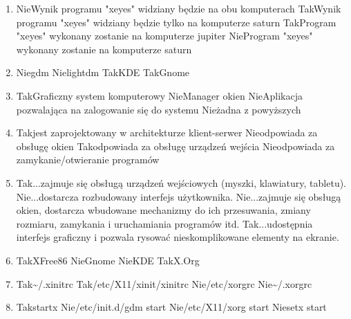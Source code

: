 \begin{enumerate}
	\item {}
	{Nie}{Wynik programu "xeyes" widziany będzie na obu komputerach}
	{Tak}{Wynik programu "xeyes" widziany będzie tylko na komputerze saturn}
	{Tak}{Program "xeyes" wykonany zostanie na komputerze jupiter}
	{Nie}{Program "xeyes" wykonany zostanie na komputerze saturn}

	\item {}
	{Nie}{gdm}
	{Nie}{lightdm}
	{Tak}{KDE}
	{Tak}{Gnome}
	
	\item {}
	{Tak}{Graficzny system komputerowy}
	{Nie}{Manager okien}
	{Nie}{Aplikacja pozwalająca na zalogowanie się do systemu}
	{Nie}{żadna z powyższych}	

	\item {}
	{Tak}{jest zaprojektowany w architekturze klient-serwer}
	{Nie}{odpowiada za obsługę okien}
	{Tak}{odpowiada za obsługę urządzeń wejścia}
	{Nie}{odpowiada za zamykanie/otwieranie programów}

	\item {}
	{Tak}{...zajmuje się obsługą urządzeń wejściowych (myszki, klawiatury, tabletu).}
	{Nie}{...dostarcza rozbudowany interfejs użytkownika.}
	{Nie}{...zajmuje się obsługą okien, dostarcza wbudowane mechanizmy do ich przesuwania, zmiany rozmiaru, zamykania i uruchamiania programów itd.}
	{Tak}{...udostępnia interfejs graficzny i pozwala rysować nieskomplikowane elementy na ekranie.}
	
	\item {}
	{Tak}{XFree86}
	{Nie}{Gnome}
	{Nie}{KDE}
	{Tak}{X.Org}
	
	\item {}
	{Tak}{\textasciitilde/.xinitrc}
	{Tak}{/etc/X11/xinit/xinitrc}
	{Nie}{/etc/xorgrc}
	{Nie}{\textasciitilde/.xorgrc}
	
	\item {}
	{Tak}{startx}
	{Nie}{/etc/init.d/gdm start}
	{Nie}{/etc/X11/xorg start}
	{Nie}{setx start}
	

\end{enumerate}
